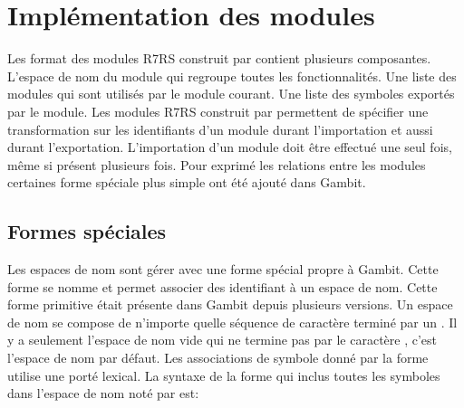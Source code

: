 
\chapter{Implémentation des modules}

Les format des modules R7RS construit par  contient
plusieurs composantes. L'espace de nom du module qui regroupe toutes les
fonctionnalités. Une liste des modules qui sont utilisés par le module courant.
Une liste des symboles exportés par le module.  Les modules R7RS construit par
 permettent de spécifier une transformation sur les
identifiants d'un module durant l'importation et aussi durant l'exportation.
L'importation d'un module doit être effectué une seul fois, même si présent
plusieurs fois.  Pour exprimé les relations entre les modules certaines forme
spéciale plus simple ont été ajouté dans Gambit.



\section{Formes spéciales}

Les espaces de nom sont gérer avec une forme spécial propre à Gambit. Cette
forme se nomme  et permet associer des identifiant à un
espace de nom. Cette forme primitive était présente dans Gambit depuis
plusieurs versions.  Un espace de nom se compose de n'importe quelle séquence
de caractère terminé par un \lstcode{#}. Il y a seulement l'espace de nom vide
qui ne termine pas par le caractère \lstcode{#}, c'est l'espace de nom par
défaut.  Les associations de symbole donné par la forme 
utilise une porté lexical. La syntaxe de la forme  qui
inclus toutes les symboles dans l'espace de nom noté par  est:

